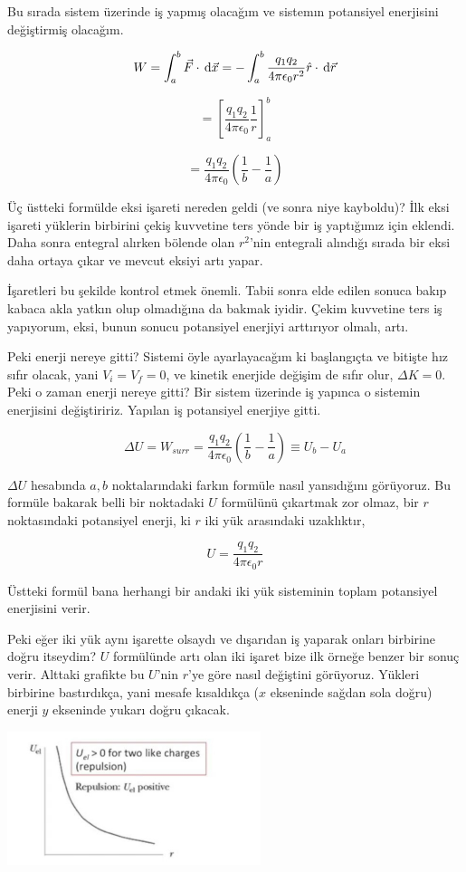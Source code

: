 \documentclass[12pt,fleqn]{article}\usepackage{../../common}
\begin{document}
Bu sırada sistem üzerinde iş yapmış olacağım ve sistemın potansiyel enerjisini
değiştirmiş olacağım.

$$
W = \int _{a}^{b} \vec{F} \cdot \,\mathrm{d} \vec{x} =
-\int _{a}^{b} \frac{q_1 q_2}{4 \pi \epsilon_0 r^2} \hat{r} \cdot \,\mathrm{d} \vec{r}
$$

$$
= \left[ \frac{q_1 q_2}{4 \pi \epsilon_0} \frac{1}{r} \right]_{a}^{b} 
$$

$$
= \frac{q_1 q_2}{4 \pi \epsilon_0} (\frac{1}{b} - \frac{1}{a})
$$  

Üç üstteki formülde eksi işareti nereden geldi (ve sonra niye kayboldu)? İlk
eksi işareti yüklerin birbirini çekiş kuvvetine ters yönde bir iş yaptığımız
için eklendi. Daha sonra entegral alırken bölende olan $r^2$'nin entegrali
alındığı sırada bir eksi daha ortaya çıkar ve mevcut eksiyi artı yapar.

İşaretleri bu şekilde kontrol etmek önemli. Tabii sonra elde edilen sonuca bakıp
kabaca akla yatkın olup olmadığına da bakmak iyidir. Çekim kuvvetine ters iş
yapıyorum, eksi, bunun sonucu potansiyel enerjiyi arttırıyor olmalı, artı.

Peki enerji nereye gitti? Sistemi öyle ayarlayacağım ki başlangıçta ve bitişte
hız sıfır olacak, yani $V_i=V_f=0$, ve kinetik enerjide değişim de sıfır olur,
$\Delta K = 0$. Peki o zaman enerji nereye gitti? Bir sistem üzerinde iş yapınca
o sistemin enerjisini değiştiririz. Yapılan iş potansiyel enerjiye gitti. 

$$
\Delta U = W_{surr} =
\frac{q_1 q_2}{4 \pi \epsilon_0} \left( \frac{1}{b} - \frac{1}{a} \right) \equiv 
U_b - U_a
$$

$\Delta U$ hesabında $a,b$ noktalarındaki farkın formüle nasıl yansıdığını
görüyoruz. Bu formüle bakarak belli bir noktadaki $U$ formülünü çıkartmak zor
olmaz, bir $r$ noktasındaki potansiyel enerji, ki $r$ iki yük arasındaki
uzaklıktır,

$$
U = \frac{q_1 q_2}{4 \pi \epsilon_0 r}
$$

Üstteki formül bana herhangi bir andaki iki yük sisteminin toplam potansiyel
enerjisini verir.

Peki eğer iki yük aynı işarette olsaydı ve dışarıdan iş yaparak onları birbirine
doğru itseydim? $U$ formülünde artı olan iki işaret bize ilk örneğe benzer bir
sonuç verir. Alttaki grafikte bu $U$'nin $r$'ye göre nasıl değiştini
görüyoruz. Yükleri birbirine bastırdıkça, yani mesafe kısaldıkça ($x$ ekseninde
sağdan sola doğru) enerji $y$ ekseninde yukarı doğru çıkacak.

\includegraphics[width=20em]{08_05.jpg}
\end{document}
